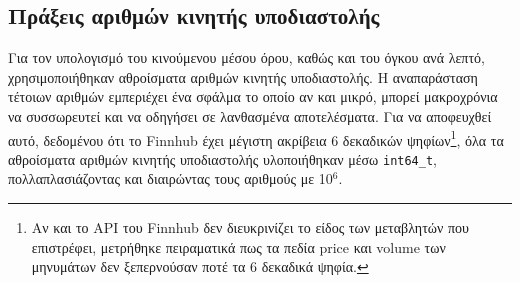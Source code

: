 \documentclass[12pt]{article}
\begin{document}
\subsection{Πράξεις αριθμών κινητής υποδιαστολής}
Για τον υπολογισμό του κινούμενου μέσου όρου, καθώς και του όγκου ανά λεπτό, χρησιμοποιήθηκαν αθροίσματα αριθμών κινητής υποδιαστολής. Η αναπαράσταση τέτοιων αριθμών εμπεριέχει ένα σφάλμα το οποίο αν και μικρό, μπορεί μακροχρόνια να συσσωρευτεί και να οδηγήσει σε λανθασμένα αποτελέσματα. Για να αποφευχθεί αυτό, δεδομένου ότι το Finnhub έχει μέγιστη ακρίβεια 6 δεκαδικών ψηφίων\footnote{Αν και το API του Finnhub δεν διευκρινίζει το είδος των μεταβλητών που επιστρέφει, μετρήθηκε πειραματικά πως τα πεδία price και volume των μηνυμάτων δεν ξεπερνούσαν ποτέ τα 6 δεκαδικά ψηφία.}, όλα τα αθροίσματα αριθμών κινητής υποδιαστολής υλοποιήθηκαν μέσω \texttt{int64\_t}, πολλαπλασιάζοντας και διαιρώντας τους αριθμούς με 10\(^6\).
\end{document}
